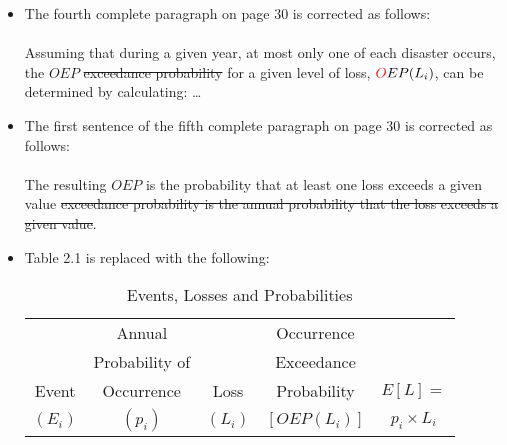 \documentclass[]{article}
\begin{document}
\begin{itemize}
\item The fourth complete paragraph on page 30 is corrected as follows:\\
\\
Assuming that during a given year, at most only one \color{red} of each \color{black} disaster occurs, the \color{red} $OEP$  \sout{exceedance probability} \color{black} for a given level of loss, $\color{red}O \color{black}EP(L_i)$, can be determined by calculating: \ldots
\item The first sentence of the fifth complete paragraph on page 30 is corrected as follows:\\
\\
The resulting \color{red} $OEP$ is the probability that at least one loss exceeds a given value  \sout{exceedance probability is the annual probability that the loss exceeds a given value}\color{black}.
\newpage
\item Table 2.1 is replaced with the following:
\begin{table}[h]
  \centering
  \caption{Events, Losses and Probabilities}
    \begin{tabular}{crrrr}
    \toprule
    
 & \multicolumn{1}{c}{Annual} & & \multicolumn{1}{c}{Occurrence}
 &   \\

 & \multicolumn{1}{c}{Probability of } & 
 & \multicolumn{1}{c}{Exceedance} &  \\

Event & \multicolumn{1}{c}{Occurrence} & \multicolumn{1}{c}{Loss}
 & \multicolumn{1}{c}{Probability} & \multicolumn{1}{c}{$E[L] =$ } \\

\multicolumn{1}{c}{$(E_i)$} & \multicolumn{1}{c}{$(p_i)$} & \multicolumn{1}{c}{$(L_i)$}
 & \multicolumn{1}{c}{$[OEP(L_i)]$} & \multicolumn{1}{c}{$p_i \times L_i$ } \\



\end{tabular}
\end{table}
\end{itemize}
\end{document}
